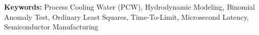 \documentclass[fontset=none, a4paper, 12pt]{ctexart}
\begin{document}
\vspace{1em}
\noindent \textbf{Keywords:} Process Cooling Water (PCW), Hydrodynamic Modeling, Binomial Anomaly Test, Ordinary Least Squares, Time-To-Limit, Microsecond Latency, Semiconductor Manufacturing

\newpage

{}
\tableofcontents
\newpage

{}
\listoftables
\newpage

{}
\listoffigures
\newpage

\clearpage
{}
\setcounter{page}{1}
\end{document}
